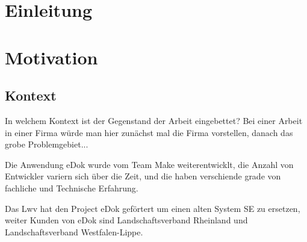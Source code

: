\documentclass[12pt,oneside]{article}
\begin{document}
\clearpage
\tableofcontents
\clearpage

\listoffigures

\listoftables
\clearpage


\cleardoublepage
{}
    \setcounter{page}{1}
\lhead{\nouppercase{\leftmark}}


\section{Einleitung} \label{sec:einleitung}%

\section{Motivation} %




\subsection{Kontext}
In welchem Kontext ist der Gegenstand der Arbeit eingebettet? Bei einer Arbeit in einer Firma würde man hier zunächst mal die Firma vorstellen, danach das grobe Problemgebiet...

Die Anwendung eDok wurde vom Team Make weiterentwicklt, die Anzahl von Entwickler variern sich über die Zeit, und die haben verschiende grade von fachliche und Technische Erfahrung.

Das Lwv hat den Project eDok geförtert um einen alten System SE zu ersetzen, weiter Kunden von eDok sind Landschaftsverband Rheinland und Landschaftsverband Westfalen-Lippe.



%
\end{document}
